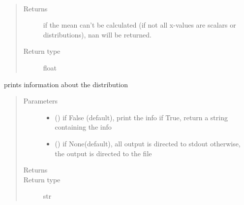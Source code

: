 \documentclass[letterpaper,10pt,english]{sphinxmanual}
\begin{document}
\begin{fulllineitems}
\begin{fulllineitems}
\label{\detokenize{Reference:salabim.Pdf.mean}}~\begin{quote}\begin{description}
\item[{Returns}] \leavevmode
{} \textendash{} if the mean can’t be calculated (if not all x-values are scalars or distributions),
nan will be returned.

\item[{Return type}] \leavevmode
float

\end{description}\end{quote}

\end{fulllineitems}


\begin{fulllineitems}
\label{\detokenize{Reference:salabim.Pdf.print_info}}
prints information about the distribution
\begin{quote}\begin{description}
\item[{Parameters}] \leavevmode\begin{itemize}
\item {} 
 () \textendash{} if False (default), print the info
if True, return a string containing the info

\item {} 
 () \textendash{} if None(default), all output is directed to stdout 
otherwise, the output is directed to the file

\end{itemize}

\item[{Returns}] \leavevmode
{}

\item[{Return type}] \leavevmode
str

\end{description}\end{quote}

\end{fulllineitems}


\end{fulllineitems}
\end{document}
